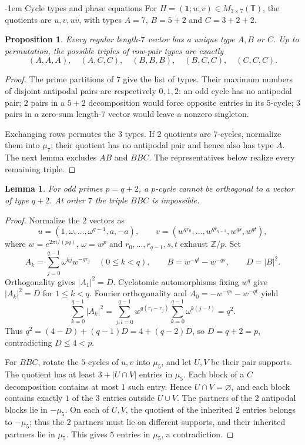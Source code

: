 \documentclass[11pt,a4paper]{article}
\makeatletter
\newtheorem{proposition}[theorem]{Proposition}
\newtheorem{lemma}[theorem]{Lemma}
\theoremstyle{plain}
\theoremstyle{definition}
\numberwithin{equation}{section}
\renewcommand\subsection{\@startsection{subsection}{2}{\z@}  {\medskipamount}  {-1em}  {\normalfont\normalsize\bfseries}}
\makeatother
\begin{document}
\subsection{Cycle types and phase equations}\label{sec:overview}\label{sec:preliminaries}
For $H=(\mathbf1;u;v)\in M_{3\times7}(\mathbb T)$, the quotients are $u,v,u\bar{v}$, with types $A=7$, $B=5+2$ and $C=3+2+2$.
\begin{proposition}\label{pre:types}\label{pre:symmetry}\label{pre:AA}\label{pre:main}
Every regular length-$7$ vector has a unique type $A,B$ or $C$. Up to permutation, the possible triples of row-pair types are exactly
$$
 \boxed{
 (A,A,A),\quad
 (A,C,C),\quad
 (B,B,B),\quad
 (B,C,C),\quad
 (C,C,C).}
$$
\end{proposition}
\begin{proof}
The prime partitions of $7$ give the list of types. Their maximum numbers of disjoint antipodal pairs are respectively $0,1,2$: an odd cycle has no antipodal pair; $2$ pairs in a $5+2$ decomposition would force opposite entries in its $5$-cycle; $3$ pairs in a zero-sum length-$7$ vector would leave a nonzero singleton.

Exchanging rows permutes the $3$ types. If $2$ quotients are $7$-cycles, normalize them into $\mu_7$; their quotient has no antipodal pair and hence also has type $A$. The next lemma excludes $AB$ and $BBC$. The representatives below realize every remaining triple.
\end{proof}
\begin{lemma}\label{pre:AB}\label{pre:BBC}
For odd primes $p=q+2$, a $p$-cycle cannot be orthogonal to a vector of type $q+2$. At order $7$ the triple $BBC$ is impossible.
\end{lemma}
\begin{proof}
Normalize the $2$ vectors as
$$
 u=(1,\omega,\ldots,\omega^{q-1},a,-a),\qquad
 v=(w^{qr_0},\ldots,w^{qr_{q-1}},w^{qs},w^{qt}),
$$
where $w=e^{2\pi i/(pq)}$, $\omega=w^p$ and $r_0,\ldots,r_{q-1},s,t$ exhaust $\mathbb Z/p$. Set
$$
 A_k=\sum_{j=0}^{q-1}\omega^{kj}w^{-qr_j}\quad(0\le k<q),
 \qquad B=w^{-qt}-w^{-qs},\qquad D=|B|^2.
$$
Orthogonality gives $|A_1|^2=D$. Cyclotomic automorphisms fixing $w^q$ give $|A_k|^2=D$ for $1\le k<q$. Fourier orthogonality and $A_0=-w^{-qs}-w^{-qt}$ yield
$$
 \sum_{k=0}^{q-1}|A_k|^2
 =\sum_{j,l=0}^{q-1}w^{q(r_l-r_j)}
       \sum_{k=0}^{q-1}\omega^{k(j-l)}
 =q^2.
$$
Thus $q^2=(4-D)+(q-1)D=4+(q-2)D$, so $D=q+2=p$, contradicting $D\le4<p$.

For $BBC$, rotate the $5$-cycles of $u,v$ into $\mu_5$, and let $U,V$ be their pair supports. The quotient has at least $3+|U\cap V|$ entries in $\mu_5$. Each block of a $C$ decomposition contains at most $1$ such entry. Hence $U\cap V=\varnothing$, and each block contains exactly $1$ of the $3$ entries outside $U\cup V$. The partners of the $2$ antipodal blocks lie in $-\mu_5$. On each of $U,V$, the quotient of the inherited $2$ entries belongs to $-\mu_5$; thus the $2$ partners must lie on different supports, and their inherited partners lie in $\mu_5$. This gives $5$ entries in $\mu_5$, a contradiction.
\end{proof}
\end{document}

